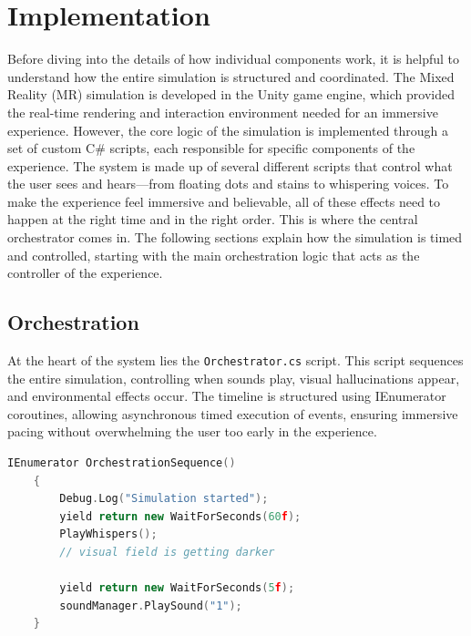 \chapter{Implementation}
\label{ch:implementation}


Before diving into the details of how individual components work, it is helpful to understand how the entire simulation is structured and coordinated. The Mixed Reality (MR) simulation is developed in the Unity game engine, which provided the real-time rendering and interaction environment needed for an immersive experience. However, the core logic of the simulation is implemented through a set of custom C\# scripts, each responsible for specific components of the experience. The system is made up of several different scripts that control what the user sees and hears—from floating dots and stains to whispering voices. To make the experience feel immersive and believable, all of these effects need to happen at the right time and in the right order. This is where the central orchestrator comes in. The following sections explain how the simulation is timed and controlled, starting with the main orchestration logic that acts as the controller of the experience.

\section{Orchestration}
At the heart of the system lies the \texttt{Orchestrator.cs} script. This script sequences the entire simulation, controlling when sounds play, visual hallucinations appear, and environmental effects occur. The timeline is structured using IEnumerator coroutines, allowing asynchronous timed execution of events, ensuring immersive pacing without overwhelming the user too early in the experience.

\begin{lstlisting}[language=C++, caption={Orchestration Coroutine}, label={lst:orchestration}]
    IEnumerator OrchestrationSequence()
    {
        Debug.Log("Simulation started");
        yield return new WaitForSeconds(60f);
        PlayWhispers();
        // visual field is getting darker
    
        yield return new WaitForSeconds(5f);
        soundManager.PlaySound("1");
    }
    \end{lstlisting}
    

